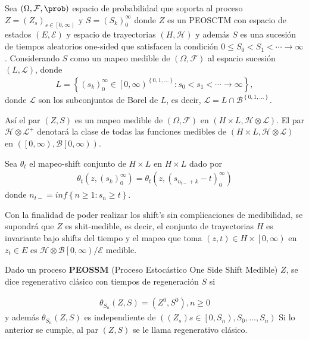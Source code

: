 \begin{Def}
Sea $\left(\Omega,\mathcal{F},\prob\right)$ espacio de probabilidad que soporta al proceso $Z=\left(Z_{s}\right)_{s\in\left[0,\infty\right)}$ y $S=\left(S_{k}\right)_{0}^{\infty}$ donde $Z$ es un PEOSCTM con espacio de estados $\left(E,\mathcal{E}\right)$  y espacio de trayectorias $\left(H,\mathcal{H}\right)$  y adem\'as $S$ es una sucesi\'on de tiempos aleatorios one-sided que satisfacen la condici\'on $0\leq S_{0}<S_{1}<\cdots\rightarrow\infty$. Considerando $S$ como un mapeo medible de $\left(\Omega,\mathcal{F}\right)$ al espacio sucesi\'on $\left(L,\mathcal{L}\right)$, donde 
\begin{eqnarray*}
L=\left\{\left(s_{k}\right)_{0}^{\infty}\in\left[0,\infty\right)^{\left\{0,1,\ldots\right\}}:s_{0}<s_{1}<\cdots\rightarrow\infty\right\},
\end{eqnarray*}
donde $\mathcal{L}$ son los subconjuntos de Borel de $L$, es decir, $\mathcal{L}=L\cap\mathcal{B}^{\left\{0,1,\ldots\right\}}$.

As\'i el par $\left(Z,S\right)$ es un mapeo medible de  $\left(\Omega,\mathcal{F}\right)$ en $\left(H\times L,\mathcal{H}\otimes\mathcal{L}\right)$. El par $\mathcal{H}\otimes\mathcal{L}^{+}$ denotar\'a la clase de todas las funciones medibles de $\left(H\times L,\mathcal{H}\otimes\mathcal{L}\right)$ en $\left(\left[0,\infty\right),\mathcal{B}\left[0,\infty\right)\right)$.
\end{Def}


\begin{Def}
Sea $\theta_{t}$ el mapeo-shift conjunto de $H\times L$ en $H\times L$ dado por
\begin{eqnarray*}
\theta_{t}\left(z,\left(s_{k}\right)_{0}^{\infty}\right)=\theta_{t}\left(z,\left(s_{n_{t-}+k}-t\right)_{0}^{\infty}\right)
\end{eqnarray*}
donde 
$n_{t-}=inf\left\{n\geq1:s_{n}\geq t\right\}$.
\end{Def}

\begin{Note}
Con la finalidad de poder realizar los shift's sin complicaciones de medibilidad, se supondr\'a que $Z$ es shit-medible, es decir, el conjunto de trayectorias $H$ es invariante bajo shifts del tiempo y el mapeo que toma $\left(z,t\right)\in H\times\left[0,\infty\right)$ en $z_{t}\in E$ es $\mathcal{H}\otimes\mathcal{B}\left[0,\infty\right)/\mathcal{E}$ medible.
\end{Note}

\begin{Def}
Dado un proceso \textbf{PEOSSM} (Proceso Estoc\'astico One Side Shift Medible) $Z$, se dice regenerativo cl\'asico con tiempos de regeneraci\'on $S$ si 

\begin{eqnarray*}
\theta_{S_{n}}\left(Z,S\right)=\left(Z^{0},S^{0}\right),n\geq0
\end{eqnarray*}
y adem\'as $\theta_{S_{n}}\left(Z,S\right)$ es independiente de $\left(\left(Z_{s}\right)s\in\left[0,S_{n}\right),S_{0},\ldots,S_{n}\right)$
Si lo anterior se cumple, al par $\left(Z,S\right)$ se le llama regenerativo cl\'asico.
\end{Def}

